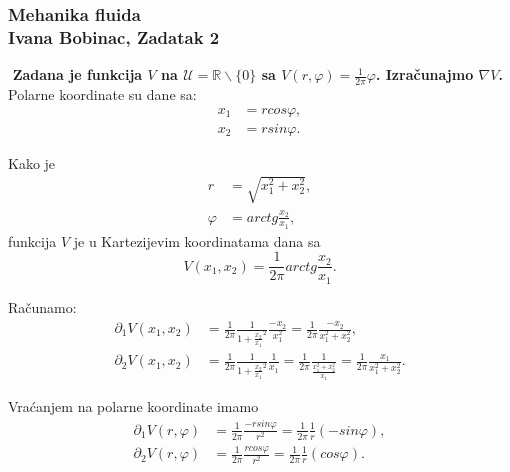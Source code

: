 \documentclass[a4paper,oneside,12pt]{memoir} %
\begin{document}
\subsubsection*{Mehanika fluida \\ Ivana Bobinac, Zadatak 2}	
$ $
\textbf{Zadana je funkcija $V$ na $\mathcal{U} = \mathbb{R} \backslash \{0\}$ sa $V(r,\varphi) = \frac{1}{2 \pi} \varphi$. Izračunajmo $\nabla V$.}  \\
Polarne koordinate su dane sa:
\begin{align*}
x_1 &= r cos \varphi,\\
x_2 &= r sin \varphi.
\end{align*}

Kako je
\begin{align*}
r &= \sqrt{x_1^2 + x_2^2}, \\
\varphi &= arctg\frac{x_2}{x_1},
\end{align*}
funkcija $V$ je u Kartezijevim koordinatama dana sa 
\begin{equation*}
V(x_1,x_2) = \frac{1}{2 \pi} arctg\frac{x_2}{x_1}.
\end{equation*}

Računamo:
\begin{align*}
\partial_1 V(x_1,x_2) &= \frac{1}{2 \pi} \frac{1}{1+\frac{x_2}{x_1}^2}\frac{-x_2}{x_1^2} = \frac{1}{2 \pi} \frac{-x_2}{x_1^2 + x_2^2},\\
\partial_2 V(x_1,x_2) &= \frac{1}{2 \pi} \frac{1}{1+\frac{x_2}{x_1}^2}\frac{1}{x_1} = \frac{1}{2 \pi} \frac{1}{\frac{x_1^2 + x_2^2}{x_1}} = \frac{1}{2 \pi} \frac{x_1}{x_1^2 + x_2^2}.
\end{align*}

Vraćanjem na polarne koordinate imamo
\begin{align*}
\partial_1 V(r,\varphi) &= \frac{1}{2 \pi} \frac{-r sin\varphi}{r^2} = \frac{1}{2 \pi} \frac{1}{r}(-sin\varphi),\\
\partial_2 V(r,\varphi) &= \frac{1}{2 \pi} \frac{r cos\varphi}{r^2} = \frac{1}{2 \pi} \frac{1}{r}(cos\varphi).
\end{align*}
\end{document}
